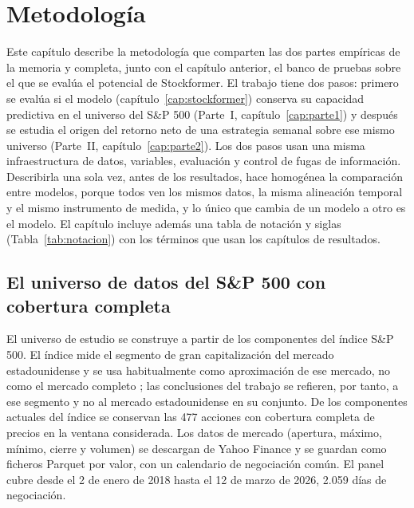 \chapter{Metodología}\label{cap:metodologia}

Este capítulo describe la metodología que comparten las dos partes empíricas de la
memoria y completa, junto con el capítulo anterior, el banco de pruebas sobre el que se
evalúa el potencial de Stockformer. El trabajo tiene dos pasos: primero se evalúa si el
modelo (capítulo~\ref{cap:stockformer}) conserva su capacidad predictiva en el universo
del S\&P 500 (Parte~I,
capítulo~\ref{cap:parte1}) y después se estudia el origen del retorno neto de una
estrategia semanal sobre ese mismo universo (Parte~II, capítulo~\ref{cap:parte2}). Los dos
pasos usan una misma infraestructura de datos, variables, evaluación y control de fugas de
información. Describirla una sola vez, antes de los resultados, hace homogénea la
comparación entre modelos, porque todos ven los mismos datos, la misma alineación temporal
y el mismo instrumento de medida, y lo único que cambia de un modelo a otro es el modelo. El
capítulo incluye además una tabla de notación y siglas (Tabla~\ref{tab:notacion}) con los
términos que usan los capítulos de resultados.

\section{El universo de datos del S\&P 500 con cobertura completa}\label{sec:met-datos}

El universo de estudio se construye a partir de los componentes del índice S\&P 500. El
índice mide el segmento de gran capitalización del mercado estadounidense y se usa
habitualmente como aproximación de ese mercado, no como el mercado completo
\autocite{spdji2025methodology}; las conclusiones del trabajo se refieren, por tanto, a
ese segmento y no al mercado estadounidense en su conjunto. De los componentes actuales
del índice se conservan las 477 acciones con cobertura completa de precios en la ventana
considerada. Los datos de mercado (apertura, máximo, mínimo, cierre y volumen) se
descargan de Yahoo Finance \autocite{yahoofinance} y se guardan como ficheros Parquet por
valor, con un calendario de negociación común. El panel cubre desde el 2 de enero de 2018
hasta el 12 de marzo de 2026, 2.059 días de negociación.

